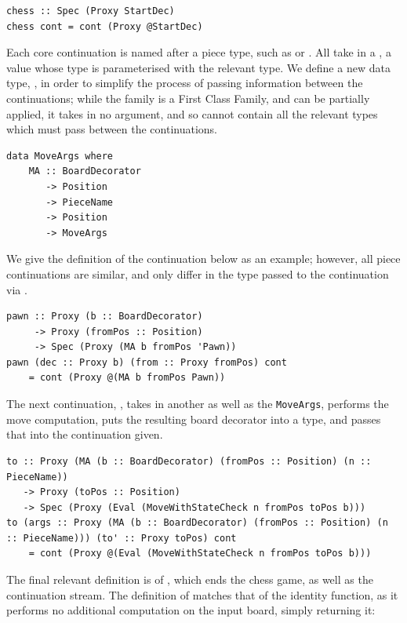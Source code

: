 \begin{lstlisting}
chess :: Spec (Proxy StartDec)
chess cont = cont (Proxy @StartDec)
\end{lstlisting}

Each core continuation is named after a piece type, such as  or . All take in a , a  value whose type is parameterised with the relevant  type. We define a new data type, , in order to simplify the process of passing information between the continuations; while the  family is a First Class Family, and can be partially applied, it takes in no  argument, and so cannot contain all the relevant types which must pass between the continuations.

\begin{lstlisting}
data MoveArgs where
    MA :: BoardDecorator
       -> Position
       -> PieceName
       -> Position
       -> MoveArgs
\end{lstlisting}

We give the definition of the  continuation below as an example; however, all piece continuations are similar, and only differ in the  type passed to the continuation via .

\begin{lstlisting}
pawn :: Proxy (b :: BoardDecorator)
     -> Proxy (fromPos :: Position)
     -> Spec (Proxy (MA b fromPos 'Pawn))
pawn (dec :: Proxy b) (from :: Proxy fromPos) cont
    = cont (Proxy @(MA b fromPos Pawn))
\end{lstlisting}

The next continuation, , takes in another  as well as the \lstinline{MoveArgs}, performs the move computation, puts the resulting board decorator into a  type, and passes that  into the continuation given.

\begin{lstlisting}
to :: Proxy (MA (b :: BoardDecorator) (fromPos :: Position) (n :: PieceName))
   -> Proxy (toPos :: Position)
   -> Spec (Proxy (Eval (MoveWithStateCheck n fromPos toPos b)))
to (args :: Proxy (MA (b :: BoardDecorator) (fromPos :: Position) (n :: PieceName))) (to' :: Proxy toPos) cont
    = cont (Proxy @(Eval (MoveWithStateCheck n fromPos toPos b)))
\end{lstlisting}

The final relevant definition is of , which ends the chess game, as well as the continuation stream. The definition of  matches that of the identity function, as it performs no additional computation on the input board, simply returning it:

